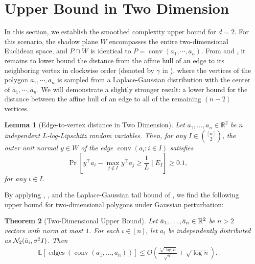 \documentclass{article}\usepackage[a4paper,margin=20mm]{geometry}
\newtheorem{theorem}{Theorem}\newtheorem{lemma}[theorem]{Lemma}\newtheorem{proposition}[theorem]{Proposition}\newtheorem{corollary}[theorem]{Corollary}\newtheorem{definition}[theorem]{Definition}\newtheorem{claim}[theorem]{Claim}\newtheorem{remark}[theorem]{Remark}\newtheorem{observation}[theorem]{Observation}\newtheorem{conjecture}[theorem]{Conjecture}\newtheorem{example}[theorem]{Example}
\newcommand{\R}{\mathbb R}
\newcommand{\E}{\mathbb E}
\newcommand{\conv}{\operatorname{conv}}
\newcommand{\edges}{\operatorname{edges}}
\begin{document}
\section{Upper Bound in Two Dimension}\label{sec:ub-2d}

In this section, we establish the smoothed complexity upper bound for $d = 2$.
For this scenario, the shadow plane $W$ encompasses the entire two-dimensional Euclidean space, and $P \cap W$ is identical to $P = \conv(a_1, \cdots, a_n)$.
From  and , it remains to lower bound the distance from the
affine hull of an edge to its neighboring vertex in clockwise order (denoted by 
$\gamma$ in ), where the vertices of the polygon $a_1, \cdots, a_n$ is sampled from a Laplace-Gaussian distribution with the center of $\bar{a}_1, \cdots, \bar{a}_n$.
We will demonstrate a slightly stronger result: a lower bound for the distance between the
affine hull of an edge to all of the remaining $(n-2)$ vertices.

\begin{lemma}[Edge-to-vertex distance in Two Dimension]\label{lem:dist-2d}
    Let $a_1, \ldots, a_n \in \R^2$ be $n$ independent $L$-log-Lipschitz random variables.
    Then, for any $I \in \binom{[n]}{2}$, the outer unit normal
    $y \in W$ of the edge $\conv(a_i : i\in I)$ satisfies
    $$\Pr[y^\top a_i - \max_{j \notin I} y^\top a_j \geq \frac{1}{L} \mid E_I] \geq 0.1,$$
    for any $i \in I$.
\end{lemma}



By applying , , and the Laplace-Gaussian tail bound of , 
we find the following upper bound for two-dimensional polygons under Gaussian perturbation:
\begin{theorem}[Two-Dimensional Upper Bound]\label{thm:ub-2d}
    Let $\Bar{a}_1, \ldots, \Bar{a}_n \in \R^2$ be $n > 2$ vectors with norm at
    most $1$. For each $i \in [n]$, let $a_i$ be independently distributed as
    $\mathcal{N}_2(\Bar{a}_i, \sigma^2 I)$. Then \begin{align*}
        \E\left[ \edges\left(\conv(a_1, \ldots, a_n) \right) \right] \leq O\left(\frac{\sqrt[4]{\log n}}{\sqrt{\sigma}} + \sqrt{\log n}\right).
    \end{align*}
\end{theorem}
\end{document}
